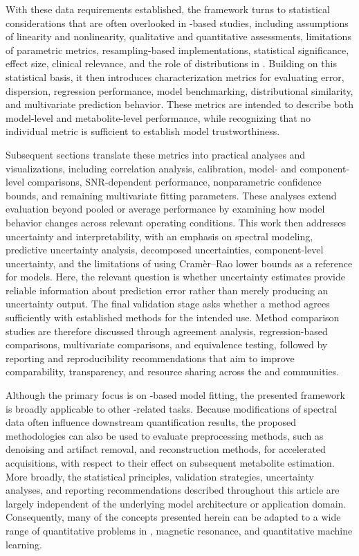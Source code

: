 With these data requirements established, the framework turns to statistical considerations that are often overlooked in \DL-based \MRS studies, including assumptions of linearity and nonlinearity, qualitative and quantitative assessments, limitations of parametric metrics, resampling-based implementations, statistical significance, effect size, clinical relevance, and the role of distributions in \DL. Building on this statistical basis, it then introduces characterization metrics for evaluating error, dispersion, regression performance, model benchmarking, distributional similarity, and multivariate prediction behavior. These metrics are intended to describe both model-level and metabolite-level performance, while recognizing that no individual metric is sufficient to establish model trustworthiness.

Subsequent sections translate these metrics into practical analyses and visualizations, including correlation analysis, calibration, model- and component-level comparisons, SNR-dependent performance, nonparametric confidence bounds, and remaining multivariate fitting parameters. These analyses extend evaluation beyond pooled or average performance by examining how model behavior changes across relevant operating conditions. This work then addresses uncertainty and interpretability, with an emphasis on spectral modeling, predictive uncertainty analysis, decomposed uncertainties, component-level uncertainty, and the limitations of using Cram{\`e}r--Rao lower bounds as a reference for \DL models. Here, the relevant question is whether uncertainty estimates provide reliable information about prediction error rather than merely producing an uncertainty output. The final validation stage asks whether a \DL method agrees sufficiently with established methods for the intended use. Method comparison studies are therefore discussed through agreement analysis, regression-based comparisons, multivariate comparisons, and equivalence testing, followed by reporting and reproducibility recommendations that aim to improve comparability, transparency, and resource sharing across the \MRS and \DL communities.

Although the primary focus is on \DL-based model fitting, the presented framework is broadly applicable to other \MRS-related tasks. Because modifications of spectral data often influence downstream quantification results, the proposed methodologies can also be used to evaluate preprocessing methods, such as denoising and artifact removal, and reconstruction methods, for accelerated acquisitions, with respect to their effect on subsequent metabolite estimation. More broadly, the statistical principles, validation strategies, uncertainty analyses, and reporting recommendations described throughout this article are largely independent of the underlying model architecture or application domain. Consequently, many of the concepts presented herein can be adapted to a wide range of quantitative problems in \NMR, magnetic resonance, and quantitative machine learning.

